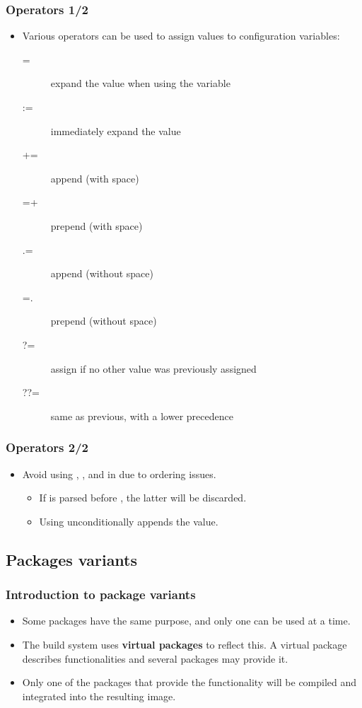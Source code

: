 \begin{frame}
  \frametitle{Operators 1/2}
  \begin{itemize}
    \item Various operators can be used to assign values to
    configuration variables:
      \begin{description}
        \item[=] expand the value when using the variable
        \item[:=] immediately expand the value
        \item[+=] append (with space)
        \item[=+] prepend (with space)
        \item[.=] append (without space)
        \item[=.] prepend (without space)
        \item[?=] assign if no other value was previously assigned
        \item[??=] same as previous, with a lower precedence
      \end{description}
  \end{itemize}
\end{frame}

\begin{frame}
  \frametitle{Operators 2/2}
  \begin{itemize}
    \item Avoid using \code{+=}, \code{=+},  and 
      in  due to ordering issues.
      \begin{itemize}
        \item If \code{+=} is parsed before , the latter will
          be discarded.
        \item Using  unconditionally appends the value.
      \end{itemize}
  \end{itemize}
\end{frame}

\subsection{Packages variants}

\begin{frame}
  \frametitle{Introduction to package variants}
  \begin{itemize}
    \item Some packages have the same purpose, and only one can be
      used at a time.
    \item The build system uses {\bf virtual packages} to reflect
      this.  A virtual package describes functionalities and several
      packages may provide it.
    \item Only one of the packages that provide the functionality will
    be compiled and integrated into the resulting image.
  \end{itemize}
\end{frame}

